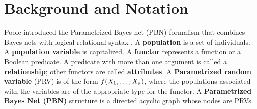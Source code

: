 \documentclass{article}
\begin{document}
%
%
\section{Background and Notation} 
Poole introduced the Parametrized Bayes net (PBN) formalism that combines Bayes nets with logical-relational syntax \cite{Poole2003}. 
A \textbf{population} is a set of individuals.  A \textbf{population variable} is capitalized. A \textbf{functor} represents a function or a Boolean predicate. A predicate with more than one argument is called a \textbf{relationship}; other functors are called \textbf{attributes}. A \textbf{Parametrized random variable} (PRV) is of the form $f(X_{1},\ldots,X_{a})$, where the populations associated with the variables are of the appropriate type for the functor.
A {\bf Parametrized Bayes Net (PBN)} structure is a directed acyclic graph  whose nodes are PRVs. 
\end{document}
